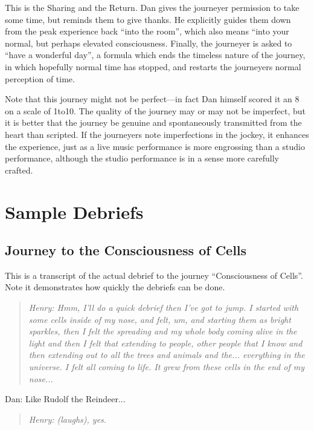 \documentclass[12pt]{book}
\begin{document}
This is the Sharing and the Return. Dan gives the journeyer permission to take some time, but reminds them to give thanks. He explicitly guides them down from the peak experience back “into the room”, which also means “into your normal, but perhaps elevated consciousness. Finally, the journeyer is asked to “have a wonderful day”, a formula which ends the timeless nature of the journey, in which hopefully normal time has stopped, and restarts the journeyers normal perception of time.


\hrulefill

Note that this journey might not be perfect—in fact Dan himself scored it an 8 on a scale of 1to10. The quality of the journey may or may not be imperfect, but it is better that the journey be genuine and spontaneously transmitted from the heart than scripted. If the journeyers note imperfections in the jockey, it enhances the experience, just as a live music performance is more engrossing than a studio performance, although the studio performance is in a sense more carefully crafted.

\chapter{Sample Debriefs}

\section{Journey to the Consciousness of Cells}

This is a transcript of the actual debrief to the journey “Consciousness of Cells”. Note it demonstrates how quickly the debriefs can be done.


\begin{quote}{\em
Henry: Hmm, I’ll do a quick debrief then I’ve got to jump. I started with some cells inside of my nose, and felt, um, and starting them as bright sparkles, then I felt the spreading and my whole body coming alive in the light and then I felt that extending to people, other people that I know and then extending out to all the trees and animals and the... everything in the universe. I felt all coming to life. It grew from these cells in the end of my nose...
}\end{quote}

Dan: Like Rudolf the Reindeer...

\begin{quote}{\em
Henry: (laughs), yes.
}\end{quote}    
\end{document}
